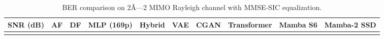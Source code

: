 \begin{longtable}[]{@{}
  >{\raggedright\arraybackslash}p{}
  >{\raggedright\arraybackslash}p{}
  >{\raggedright\arraybackslash}p{}
  >{\raggedright\arraybackslash}p{}
  >{\raggedright\arraybackslash}p{}
  >{\raggedright\arraybackslash}p{}
  >{\raggedright\arraybackslash}p{}
  >{\raggedright\arraybackslash}p{}
  >{\raggedright\arraybackslash}p{}
  >{\raggedright\arraybackslash}p{}@{}}
\caption{BER comparison on 2Ã—2 MIMO Rayleigh channel with MMSE-SIC equalization.}\label{tbl:table6}\tabularnewline
\toprule\noalign{}
\begin{minipage}[b]{\linewidth}\raggedright
SNR (dB)
\end{minipage} & \begin{minipage}[b]{\linewidth}\raggedright
AF
\end{minipage} & \begin{minipage}[b]{\linewidth}\raggedright
DF
\end{minipage} & \begin{minipage}[b]{\linewidth}\raggedright
MLP (169p)
\end{minipage} & \begin{minipage}[b]{\linewidth}\raggedright
Hybrid
\end{minipage} & \begin{minipage}[b]{\linewidth}\raggedright
VAE
\end{minipage} & \begin{minipage}[b]{\linewidth}\raggedright
CGAN
\end{minipage} & \begin{minipage}[b]{\linewidth}\raggedright
Transformer
\end{minipage} & \begin{minipage}[b]{\linewidth}\raggedright
Mamba S6
\end{minipage} & \begin{minipage}[b]{\linewidth}\raggedright
Mamba-2 SSD
\end{minipage} \\
\midrule\noalign{}
\endfirsthead
\toprule\noalign{}
\begin{minipage}[b]{\linewidth}\raggedright

\end{minipage}
\end{longtable}
